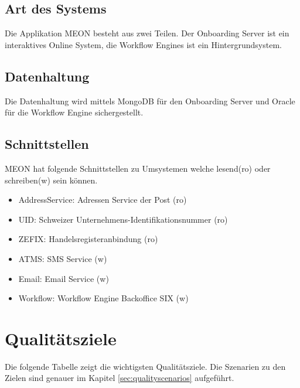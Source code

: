 \subsection{Art des Systems}

Die Applikation MEON besteht aus zwei Teilen. Der Onboarding Server ist ein interaktives Online System, die Workflow Engines ist ein Hintergrundsystem.

\subsection{Datenhaltung}

Die Datenhaltung wird mittels MongoDB für den Onboarding Server und Oracle für die Workflow Engine sichergestellt.

\subsection{Schnittstellen}

MEON hat folgende Schnittstellen zu Umsystemen welche lesend(ro) oder schreiben(w) sein können.
\begin{itemize}
	\item AddressService: Adressen Service der Post (ro)
	\item UID: Schweizer Unternehmens-Identifikationsnummer (ro) 
	\item ZEFIX: Handelsregisteranbindung (ro)
	\item ATMS: SMS Service (w)
	\item Email: Email Service (w)
	\item Workflow: Workflow Engine Backoffice SIX (w)
\end{itemize}

\section{Qualitätsziele}

Die folgende Tabelle zeigt die wichtigsten Qualitätsziele. Die Szenarien zu den Zielen sind genauer im Kapitel \ref{sec:qualityscenarios} aufgeführt.

